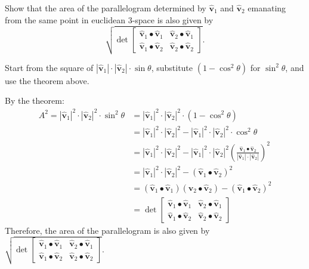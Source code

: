 \documentclass[newpage,hints,handout]{ximera}
\begin{document}
\begin{problem}
\label{9}Show that the area of the parallelogram determined by $\hat{\mathbf v}_{1}$
and $\hat{\mathbf v}_{2}$ emanating from the same point in euclidean $3$-space is also
given by%
\[
\sqrt{\det
\begin{bmatrix}
\hat{\mathbf v}_{1}\bullet\hat{\mathbf v}_{1} & \hat{\mathbf v}_{2}\bullet\hat{\mathbf v}_{1}\\
\hat{\mathbf v}_{1}\bullet\hat{\mathbf v}_{2} & \hat{\mathbf v}_{2}\bullet\hat{\mathbf v}_{2}%
\end{bmatrix}}.
\]

\begin{hint}
Start from the square of
$|\hat{\mathbf v}_{1}|\cdot|\hat{\mathbf v}_{2}|\cdot\sin\theta$, substitute
$(1-\cos^{2}\theta)$ for $\sin^{2}\theta$, and use the theorem above.
\end{hint}

\begin{freeResponse}
By the theorem:
\begin{align*}
A^2 = |\hat{\mathbf v}_{1}|^2 \cdot |\hat{\mathbf v}_{2} |^2 \cdot\sin^{2}\theta 
&= |\hat{\mathbf v}_{1}|^2 \cdot |\hat{\mathbf v}_{2} |^2 \cdot \left(1- \cos^{2}\theta\right)\\
&= |\hat{\mathbf v}_{1}|^2 \cdot |\hat{\mathbf v}_{2} |^2 - |\hat{\mathbf v}_{1}|^2 \cdot |\hat{\mathbf v}_{2} |^2 \cdot\cos^{2}\theta \\
&= |\hat{\mathbf v}_{1}|^2 \cdot |\hat{\mathbf v}_{2} |^2 - |\hat{\mathbf v}_{1}|^2 \cdot |\hat{\mathbf v}_{2} |^2 \left(  \frac{\hat{\mathbf v}_{1}\bullet\hat{\mathbf v}_{2}}{\left\vert \hat{\mathbf v}_{1}\right\vert \cdot\left\vert \hat{\mathbf v}_{2}\right\vert}\right)^2\\
&= |\hat{\mathbf v}_{1}|^2 \cdot |\hat{\mathbf v}_{2} |^2 - \left(\hat{\mathbf v}_{1}\bullet\hat{\mathbf v}_{2}\right)^2\\
&= \left(\hat{\mathbf v}_{1}\bullet\hat{\mathbf v}_{1}\right) \left(\hat{\mathbf v}_{2}\bullet\hat{\mathbf v}_{2}\right) - \left(\hat{\mathbf v}_{1}\bullet\hat{\mathbf v}_{2}\right)^2\\
&=\det
    \begin{bmatrix}
      \hat{\mathbf v}_{1}\bullet\hat{\mathbf v}_{1} & \hat{\mathbf v}_{2}\bullet\hat{\mathbf v}_{1}\\
      \hat{\mathbf v}_{1}\bullet\hat{\mathbf v}_{2} & \hat{\mathbf v}_{2}\bullet\hat{\mathbf v}_{2}
    \end{bmatrix}
\end{align*}
Therefore, the area of the parallelogram is also given by
$\sqrt{\det
    \begin{bmatrix}
      \hat{\mathbf v}_{1}\bullet\hat{\mathbf v}_{1} & \hat{\mathbf v}_{2}\bullet\hat{\mathbf v}_{1}\\
      \hat{\mathbf v}_{1}\bullet\hat{\mathbf v}_{2} & \hat{\mathbf v}_{2}\bullet\hat{\mathbf v}_{2}
    \end{bmatrix}}$.


\end{freeResponse}
\end{problem}
\end{document}
